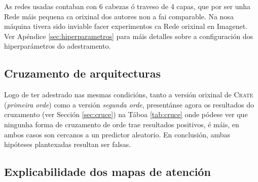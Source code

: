 As redes usadas contaban con 6 cabezas ó traveso de 4 capas, que por ser unha Rede máis pequena ca orixinal dos autores non a fai comparable. Na nosa máquina tivera sido inviable facer experimentos ca Rede orixinal en Imagenet. Ver Apéndice \ref{sec:hiperparametros} para máis detalles sobre a configuración dos hiperparámetros do adestramento.

\subsection{Cruzamento de arquitecturas}
\label{sec:res-cruce}

\begin{table}[H]
\caption[Resultados do cruzamentos de ordes para o conxunto de datos Imagenet.]{Resultados do cruzamento de ordes mostrando o rendemento no conxunto de proba cas métricas Precisión a un e a cinco (ver Sección \ref{sec:metricas}). Pódese apreciar que cambiar de orde ofrece uns resultados moi malos.}
\label{tab:cruce}
\end{table}


Logo de ter adestrado nas mesmas condicións, tanto a versión orixinal de \textsc{Crate} (\emph{primeira orde}) como a versión \emph{segunda orde}, presentánse agora os resultados do cruzamento (ver Sección \ref{sec:cruce}) na Táboa \ref{tab:cruce} onde pódese ver que ningunha forma de cruzamento de orde trae resultados positivos, é máis, en ambos casos son cercanos a un predictor aleatorio. En conclusión, ambas hipóteses plantexadas resultan ser falsas.

\subsection{Explicabilidade dos mapas de atención}
\label{sec:res-atencion-imagenet}

